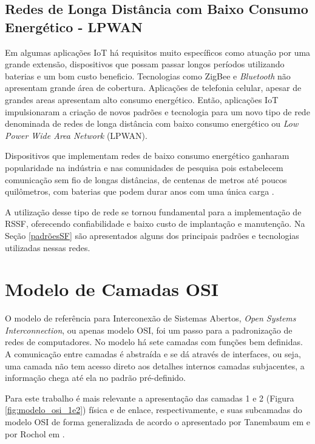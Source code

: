 \subsection{Redes de Longa Distância com Baixo Consumo Energético - LPWAN}
Em algumas aplicações IoT há requisitos muito específicos como atuação por uma grande extensão, dispositivos que possam passar longos períodos utilizando baterias e um bom custo beneficio. Tecnologias como ZigBee e \emph{Bluetooth} não apresentam grande área de cobertura. Aplicações de telefonia celular, apesar de grandes areas apresentam alto consumo energético.  Então, aplicações IoT impulsionaram a criação de novos padrões e tecnologia para um novo tipo de rede denominada de redes de longa distância com baixo consumo energético ou \emph{Low Power Wide Area Network} (LPWAN).

Dispositivos que implementam redes de baixo consumo energético ganharam popularidade na indústria e nas comunidades de pesquisa pois estabelecem comunicação sem fio de longas distâncias, de centenas de metros até poucos quilômetros, com baterias que podem durar anos com uma única carga \cite{mekki2019comparative}.

A utilização desse tipo de rede se tornou fundamental para a implementação de RSSF, oferecendo confiabilidade e baixo custo de implantação e manutenção. Na Seção \ref{padrõesSF} são apresentados alguns dos principais padrões e tecnologias utilizadas nessas redes.

\section{Modelo de Camadas OSI}
\label{osi}
O modelo de referência para Interconexão de Sistemas Abertos, \emph{Open Systems Interconnection}, ou apenas modelo OSI, foi um passo para a padronização de redes de computadores. No modelo há sete camadas com funções bem definidas. A comunicação entre camadas é abstraída e se dá através de interfaces, ou seja, uma camada não tem acesso direto aos detalhes internos camadas subjacentes, a informação chega até ela no padrão pré-definido.

Para este trabalho é mais relevante a apresentação das camadas 1 e 2 (Figura \ref{fig:modelo_osi_1e2})  física e de enlace, respectivamente, e suas subcamadas do modelo OSI de forma generalizada de acordo o apresentado por Tanembaum em \cite{tanembaum2011} e por Rochol em \cite{rochol2018sistemas}.

